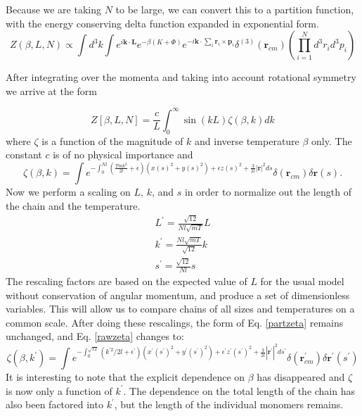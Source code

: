 \documentclass[pre,showpacs]{revtex4}
\begin{document}
Because we are taking $N$ to be large, we can convert this to a partition function, with the energy conserving delta function expanded in exponential form.
\begin{equation}
Z(\beta,L,N) \propto  \int d^3k \int e^{ i\mathbf{k\cdot L} }e^{ -\beta(K+\Phi) }e^{ -i\mathbf{k}\cdot \sum_i \mathbf{r}_i\times \mathbf{p}_i }\delta^{(3)}(\mathbf{r}_{cm})(\prod_{i=1}^N d^3r_id^3p_i)
\end{equation}

After integrating over the momenta and taking into account rotational symmetry we arrive at the form~\cite{DeutschExactVac}

\begin{equation}\label{partzeta}
Z[\beta,L,N] = \frac{c}{L} \int_0^\infty \sin(kL)\zeta(\beta,k)dk
\end{equation}
where $\zeta$ is a function of the magnitude of $k$ and inverse temperature  $\beta$ only. The constant $c$ is of no physical importance and
\begin{equation}\label{rawzeta}
\zeta(\beta,k)= \int e^{ -\int^{Nl}_0 (\frac{Tmk^2}{2l} +\epsilon)(x(s)^2 + y(s)^2)+\epsilon z(s)^2 + \frac{3}{2l}  |\dot{\mathbf{r}}|^2  ds}\delta(\mathbf{r}_{cm}) \delta \mathbf{r}(s) .
\end{equation}
Now we perform a scaling on $L$, $k$, and $s$ in order to normalize out the length of the chain and the temperature.
\begin{eqnarray}
L^\prime = \frac{\sqrt{12}}{Nl\sqrt{mT}} L\\
k^\prime = \frac{Nl\sqrt{mT}}{\sqrt{12}} k\\
s^\prime = \frac{\sqrt{12}}{Nl} s
\end{eqnarray}
The rescaling factors are based on the expected value of $L$ for the usual model without conservation of angular momentum, and produce a set of dimensionless variables. This will allow us to compare chains of all sizes and temperatures on a common scale.
After doing these rescalings, the form of Eq. \ref{partzeta} remains unchanged, and Eq. \ref{rawzeta} changes to:
\begin{equation}\label{scaledzeta}
\zeta(\beta,k^\prime)= \int e^{-\int_0^{\sqrt{12}} (k^{\prime2}/2l + \epsilon^\prime)(x^\prime(s^\prime)^2 + y^\prime(s^\prime)^2 ) + \epsilon^\prime z^\prime(s^\prime)^2  + \frac{3}{2l} |\dot{\mathbf{r}^\prime}|^2 ds^\prime}\delta(\mathbf{r}^\prime_{cm}) \delta \mathbf{r^\prime}(s^\prime)
\end{equation}
It is interesting to note that the explicit dependence on $\beta$ has disappeared and $\zeta$ is now only a function of $k^\prime$. The dependence on the total length of the chain has also been factored into $k^\prime$, but the length of the individual monomers remains.
\end{document}
